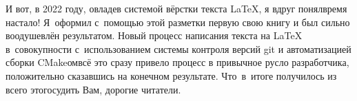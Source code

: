 {И вот, в 2022 году, овладев системой вёрстки текста \LaTeX{}, я вдруг понял\mdash время настало! Я~оформил с~помощью этой разметки первую свою книгу и был сильно воодушевлён результатом. Новый процесс написания текста на \LaTeX{} в~совокупности с~использованием системы контроля версий git и автоматизацией сборки CMake\sdash ом\mdash всё это сразу привело процесс в привычное русло разработчика, положительно сказавшись на конечном результате. Что~в~итоге получилось из всего этого\mdash судить Вам, дорогие читатели.

}
\fancyhead[LE]{\fancyplain{}{\bfseries \parttitle}}
\fancyhead[RO]{\fancyplain{}{\bfseries \rightmark}}